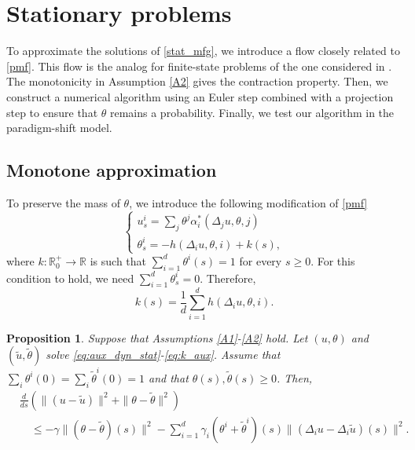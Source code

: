 \documentclass[12pt]{amsart}
\newcommand{\Rr}{{\mathbb{R}}}
\newcommand{\1}{{\chi}}
\newcommand{\lb}{\left(}
\newcommand{\rb}{\right)}
\newtheorem{pro}{Proposition}
\theoremstyle{definition}
\begin{document}
\section{Stationary problems} 
\label{sec:stationary_problem}
    To approximate the solutions of \eqref{stat_mfg}, we introduce a flow closely related to \eqref{pmf}. 
    This flow is the analog for finite-state problems of the one considered in \cite{AFG}. 
    The monotonicity in Assumption \ref{A2} gives the contraction property. 
    Then, we construct a numerical algorithm using an Euler step combined with a projection step to ensure that $\theta$ remains a probability. 
    Finally, we test our algorithm in the paradigm-shift model. 
        \subsection{Monotone approximation} 
        \label{sub:contractive_auxiliary_dynamics}
        To preserve the mass of $\theta$, we introduce the following modification of \eqref{pmf} 
        \begin{equation} \label{eq:aux_dyn_stat}
                \begin{cases}
                u_s^i      = \sum_{j} \theta^j \alpha^*_i(\Delta_j u,\theta,j) \\
                \theta_s^i = -h(\Delta_i u,\theta,i)+k(s),
            \end{cases}
        \end{equation}
        where $k:\Rr_0^+\to \Rr$ is such that  $\sum_{i=1}^d \theta^i(s) = 1$ for every $s\geq 0$. 
                For this condition to hold, we need $\sum_{i=1}^d \theta_s^i=0$. 
        Therefore,                 
                \begin{equation} \label{eq:k_aux}
                k(s) = \frac{1}{d} \sum_{i=1}^d h(\Delta_i u,\theta,i).
        \end{equation}
        \begin{pro} \label{prop:contraction_sta_sol}
                Suppose that Assumptions \ref{A1}-\ref{A2} hold. 
            Let $(u,\theta)$ and $(\tilde u, \tilde\theta)$ solve \eqref{eq:aux_dyn_stat}-\eqref{eq:k_aux}. 
                        Assume that $\sum_i \theta^i(0)= \sum_i \tilde \theta^i(0)=1$ and  that $\theta(s), \tilde \theta(s)\geq 0$. 
                        Then, 
            \begin{align*}
                &\frac{d}{ds} \lb \|(u-\tilde u) \|^2 + \|\theta-\tilde \theta\|^2  \rb \\&\quad\leq -\gamma \|(\theta- \tilde \theta)(s)\|^2 
                                                - \sum_{i=1}^d \gamma_i(\theta^i+\tilde \theta^i)(s) \|(\Delta_i u- \Delta_i \tilde u)(s)\| ^2.
            \end{align*}
                \end{pro}
\end{document}
